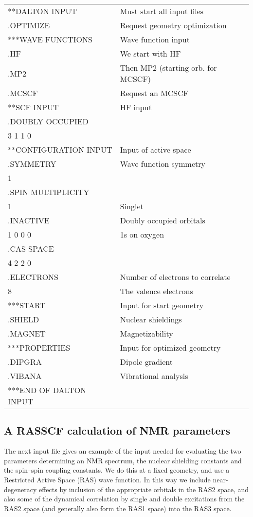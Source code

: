 {\ttfamily
\begin{tabular}{ll}
**DALTON INPUT\hspace{3cm} & Must start all input files\\
.OPTIMIZE & Request geometry optimization\\
***WAVE FUNCTIONS & Wave function input\\ %
.HF & We start with HF\\
.MP2 & Then MP2 (starting orb. for MCSCF)\\
.MCSCF & Request an MCSCF\\
**SCF INPUT & HF input\\
.DOUBLY OCCUPIED\\
 3 1 1 0\\
**CONFIGURATION INPUT & Input of active space\\
.SYMMETRY & Wave function symmetry\\
 1\\
.SPIN MULTIPLICITY\\
 1 & Singlet\\
.INACTIVE & Doubly occupied orbitals\\
 1 0 0 0 & 1s on oxygen\\
.CAS SPACE\\
 4 2 2 0\\
.ELECTRONS & Number of electrons to correlate\\
 8 & The valence electrons\\
***START & Input for start geometry\\
.SHIELD & Nuclear shieldings\\
.MAGNET & Magnetizability\\
***PROPERTIES & Input for optimized geometry\\
.DIPGRA & Dipole gradient\\
.VIBANA & Vibrational analysis\\
***END OF DALTON INPUT\\
\end{tabular}}

\subsection{A RASSCF calculation of NMR parameters}

The next input file gives an example of the input needed for
evaluating the two parameters determining an NMR spectrum, the nuclear
shielding constants and the spin--spin
coupling constants. We do this
at a fixed geometry, and use a Restricted Active Space (RAS) wave
function. In this way we include near-degeneracy effects by inclusion
of the appropriate orbitals in the RAS2 space, and also some of the
dynamical correlation  by single and
double excitations
from the RAS2 space (and generally also form the RAS1 space) into the
RAS3 space.


